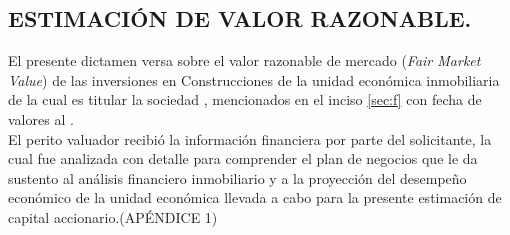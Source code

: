 \subsection{ESTIMACI\'ON DE VALOR RAZONABLE.} 

El presente dictamen versa sobre el valor razonable de mercado (\textit{\textcolor{principal}{Fair Market Value}}) de las inversiones en Construcciones de la unidad econ\'omica inmobiliaria de la cual es titular la sociedad \textcolor{principal}{\empresaSolicitante}, mencionados en el inciso \autoref{sec:f} con fecha de valores al \textcolor{principal}{\fechaValores}.\\[10pt]

El perito valuador recibi\'o la informaci\'on financiera por parte del solicitante, la cual fue analizada con detalle para comprender el plan de negocios que le da sustento al an\'alisis financiero inmobiliario y a la proyecci\'on  del desempe\~no econ\'omico de la unidad econ\'omica llevada a cabo para la presente estimaci\'on de capital accionario.(\textcolor{secundario}{AP\'ENDICE 1})